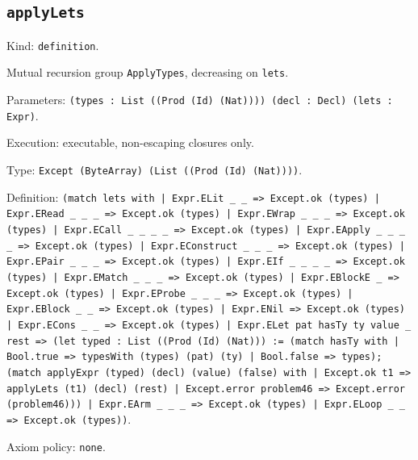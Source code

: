 \documentclass[11pt]{article}
\begin{document}
\subsection*{\texttt{applyLets}}
\noindent Kind: \texttt{definition}.\par
\noindent Mutual recursion group \texttt{ApplyTypes}, decreasing on \texttt{lets}.\par
\noindent Parameters: \texttt{(types : List ((Prod (Id) (Nat)))) (decl : Decl) (lets : Expr)}.\par
\noindent Execution: executable, non-escaping closures only.\par
\noindent Type: \texttt{Except (ByteArray) (List ((Prod (Id) (Nat))))}.\par
\noindent Definition: \texttt{(match lets with | Expr.ELit \_ \_ => Except.ok (types) | Expr.ERead \_ \_ \_ => Except.ok (types) | Expr.EWrap \_ \_ \_ => Except.ok (types) | Expr.ECall \_ \_ \_ \_ => Except.ok (types) | Expr.EApply \_ \_ \_ \_ => Except.ok (types) | Expr.EConstruct \_ \_ \_ => Except.ok (types) | Expr.EPair \_ \_ \_ => Except.ok (types) | Expr.EIf \_ \_ \_ \_ => Except.ok (types) | Expr.EMatch \_ \_ \_ => Except.ok (types) | Expr.EBlockE \_ => Except.ok (types) | Expr.EProbe \_ \_ \_ => Except.ok (types) | Expr.EBlock \_ \_ => Except.ok (types) | Expr.ENil => Except.ok (types) | Expr.ECons \_ \_ => Except.ok (types) | Expr.ELet pat hasTy ty value \_ rest => (let typed : List ((Prod (Id) (Nat))) := (match hasTy with | Bool.true => typesWith (types) (pat) (ty) | Bool.false => types); (match applyExpr (typed) (decl) (value) (false) with | Except.ok t1 => applyLets (t1) (decl) (rest) | Except.error problem46 => Except.error (problem46))) | Expr.EArm \_ \_ \_ => Except.ok (types) | Expr.ELoop \_ \_ => Except.ok (types))}.\par
\noindent Axiom policy: \texttt{none}.\par
\end{document}
